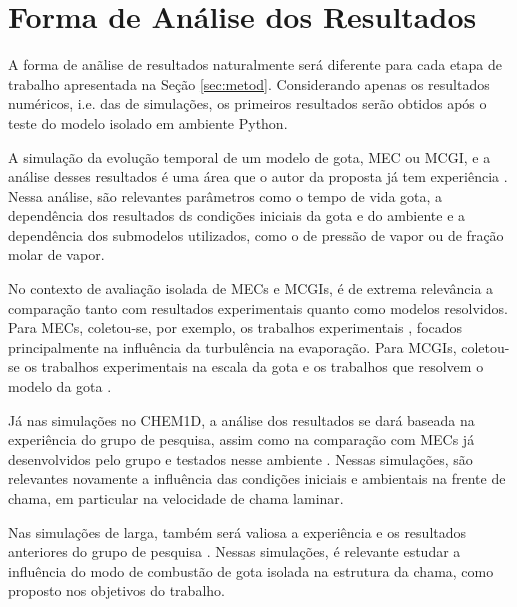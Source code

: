 
\section{Forma de Análise dos Resultados} \label{sec:resultados}

A forma de anãlise de resultados naturalmente será diferente para cada etapa de trabalho apresentada na Seção \ref{sec:metod}.
Considerando apenas os resultados numéricos, i.e. das de simulações, os primeiros resultados serão obtidos após o teste do modelo isolado em ambiente Python. 

A simulação da evolução temporal de um modelo de gota, MEC ou MCGI, e a análise desses resultados é uma área que o autor da proposta já tem experiência \cite{HenningsJ2024MT}. 
Nessa análise, são relevantes parâmetros como o tempo de vida gota, a dependência dos resultados ds condições iniciais da gota e do ambiente e a dependência dos submodelos utilizados, como o de pressão de vapor ou de fração molar de vapor.

No contexto de avaliação isolada de MECs e MCGIs, é de extrema relevância a comparação tanto com resultados experimentais quanto como modelos resolvidos.
Para MECs, coletou-se, por exemplo, os trabalhos experimentais \cite{BiroukM2006,PatelU2019,KayaEyiceD2024,ArabkhalajA2024,MaquaC2008}, focados principalmente na influência da turbulência na evaporação.
Para MCGIs, coletou-se os trabalhos experimentais na escala da gota \cite{ChoS1990SCI,CandelS1999,ChenG1996CF,Xu2002,BiroukM2000,CuociA2005,SetyawanH2015} e os trabalhos que resolvem o modelo da gota \cite{Stauch2006,CuociA2005,ChoS1990SCI,KazakovA2003CF,MarcheseA1996CF,WangW2024}.

Já nas simulações no CHEM1D, a análise dos resultados se dará baseada na experiência do grupo de pesquisa, assim como na comparação com MECs já desenvolvidos pelo grupo e testados nesse ambiente \cite{SacomanoF2018CTM,SacomanoF2019IJHMT,SacomanoF2021Fluids,SacomanoF2024CF,SacomanoF2025CF}.
Nessas simulações, são relevantes novamente a influência das condições iniciais e ambientais na frente de chama, em particular na velocidade de chama laminar.

Nas simulações de larga, também será valiosa a experiência e os resultados anteriores do grupo de pesquisa \cite{SacomanoF2017CF,SacomanoF2020CF}.
Nessas simulações, é relevante estudar a influência do modo de combustão de gota isolada na estrutura da chama, como proposto nos objetivos do trabalho.



